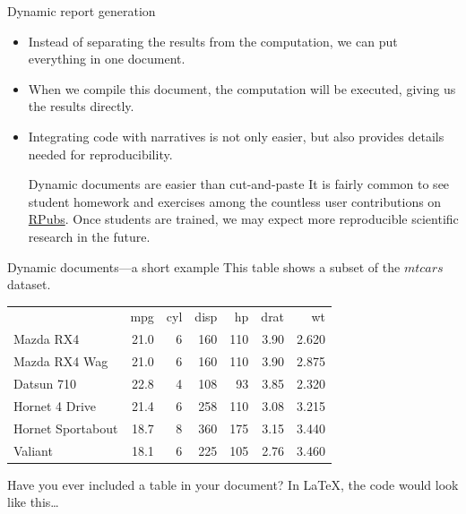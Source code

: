 \documentclass{beamer}
\begin{document}
\begin{frame}{Dynamic report generation}
\vfill
\begin{itemize}
    \item Instead of separating the results from the computation, we can put everything in one document.
    \item When we compile this document, the computation will be executed, giving us the results directly.
    \item Integrating code with narratives is not only easier, but also provides details needed for reproducibility. %
    \vfill
    \begin{exampleblock}{Dynamic documents are easier than cut-and-paste}
    It is fairly common to see student homework and exercises among the countless user contributions on \href{https://rpubs.com/}{RPubs}. Once students are trained, we may expect more reproducible scientific research in the future. %
    \end{exampleblock}
    \vfill
\end{itemize}
\end{frame}

\begin{frame}{Dynamic documents---a short example}
This table shows a subset of the $mtcars$ dataset.

\begin{center}
\begin{tabular}{lrrrrrr}
      & mpg & cyl & disp & hp & drat & wt \\
    Mazda RX4 & 21.0 & 6 & 160 & 110 & 3.90 & 2.620 \\
    Mazda RX4 Wag & 21.0 & 6 & 160 & 110 & 3.90 & 2.875 \\
    Datsun 710 & 22.8 & 4 & 108 & 93 & 3.85 & 2.320 \\
    Hornet 4 Drive & 21.4 & 6 & 258 & 110 & 3.08 & 3.215 \\
    Hornet Sportabout & 18.7 & 8 & 360 & 175 & 3.15 & 3.440 \\
    Valiant & 18.1 & 6 & 225 & 105 & 2.76 & 3.460 \\
\end{tabular}
\end{center}

Have you ever included a table in your document? In LaTeX, the code would look like this\ldots
\end{frame}
\end{document}

